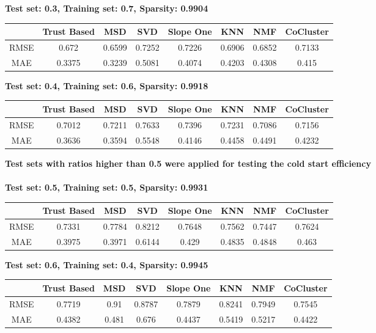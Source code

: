 	\textbf{Test set: 0.3, Training set: 0.7, Sparsity: 0.9904}
	\begin{center}
	\begin{tabular}{ | c | c | c | c | c | c | c | c |}
		\hline
		& Trust Based & MSD & SVD & Slope One & KNN & NMF & CoCluster\\ 
		\hline
		RMSE&0.672  & 0.6599  & 0.7252  & 0.7226  & 0.6906  & 0.6852  & 0.7133\\
		\hline
		MAE&0.3375  & 0.3239  & 0.5081  & 0.4074  & 0.4203  & 0.4308  & 0.415\\
		\hline
	\end{tabular}
	\end{center} 
	\vspace{1cm}
	\textbf{Test set: 0.4, Training set: 0.6, Sparsity: 0.9918}
	\begin{center}
	\begin{tabular}{ | c | c | c | c | c | c | c | c |}
		\hline
		& Trust Based & MSD & SVD & Slope One & KNN & NMF & CoCluster\\ 
		\hline
		RMSE&0.7012  & 0.7211  & 0.7633  & 0.7396  & 0.7231  & 0.7086  & 0.7156\\
		\hline
		MAE&0.3636  & 0.3594  & 0.5548  & 0.4146  & 0.4458  & 0.4491  & 0.4232\\
		\hline
	\end{tabular}
	\end{center} 
	\vspace{1cm}
	\textbf{Test sets with ratios higher than 0.5 were applied for testing the cold start efficiency}\\ \\
	\textbf{Test set: 0.5, Training set: 0.5, Sparsity: 0.9931}
	\begin{center}
	\begin{tabular}{ | c | c | c | c | c | c | c | c |}
		\hline
		& Trust Based & MSD & SVD & Slope One & KNN & NMF & CoCluster\\ 
		\hline
		RMSE&0.7331  & 0.7784  & 0.8212  & 0.7648  & 0.7562  & 0.7447  & 0.7624\\
		\hline
		MAE&0.3975  & 0.3971  & 0.6144  & 0.429  & 0.4835  & 0.4848  & 0.463\\
		\hline
	\end{tabular}
	\end{center} 
	\vspace{1cm}
	\textbf{Test set: 0.6, Training set: 0.4, Sparsity: 0.9945}
	\begin{center}
	\begin{tabular}{ | c | c | c | c | c | c | c | c |}
		\hline
		& Trust Based & MSD & SVD & Slope One & KNN & NMF & CoCluster\\ 
		\hline
		RMSE&0.7719  & 0.91  & 0.8787  & 0.7879  & 0.8241  & 0.7949  & 0.7545\\
		\hline
		MAE&0.4382  & 0.481  & 0.676  & 0.4437  & 0.5419  & 0.5217  & 0.4422\\
		\hline
	\end{tabular}
	\end{center} 
